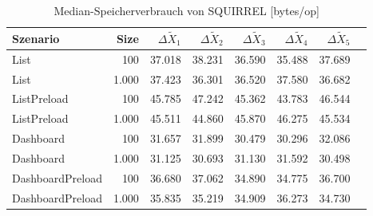 
\begin{table}[ht]
\setlength{\extrarowheight}{-1pt}
\centering
\caption{Median-Speicherverbrauch von SQUIRREL [bytes/op]}
\begin{tabular}{lrrrrrrr}
\toprule
Szenario & Size & ${\Delta \tilde{X}_1}$ & ${\Delta \tilde{X}_2}$ & ${\Delta \tilde{X}_3}$ & ${\Delta \tilde{X}_4}$ & ${\Delta \tilde{X}_5}$ \\
\midrule
	List & 100 & \cellcolor{red!50}  37.018 & \cellcolor{red!50}  38.231 & \cellcolor{red!50}  36.590 & \cellcolor{red!50}  35.488 & \cellcolor{red!50}  37.689 \\
	List & 1.000 & \cellcolor{red!50}  37.423 & \cellcolor{red!50}  36.301 & \cellcolor{red!50}  36.520 & \cellcolor{red!50}  37.580 & \cellcolor{red!50}  36.682 \\
	ListPreload & 100 & \cellcolor{red!50}  45.785 & \cellcolor{red!50}  47.242 & \cellcolor{red!50}  45.362 & \cellcolor{red!50}  43.783 & \cellcolor{red!50}  46.544 \\
	ListPreload & 1.000 & \cellcolor{red!50}  45.511 & \cellcolor{red!50}  44.860 & \cellcolor{red!50}  45.870 & \cellcolor{red!50}  46.275 & \cellcolor{red!50}  45.534 \\
	Dashboard & 100 & \cellcolor{red!50}  31.657 & \cellcolor{red!50}  31.899 & \cellcolor{red!50}  30.479 & \cellcolor{red!50}  30.296 & \cellcolor{red!50}  32.086 \\
	Dashboard & 1.000 & \cellcolor{red!50}  31.125 & \cellcolor{red!50}  30.693 & \cellcolor{red!50}  31.130 & \cellcolor{red!50}  31.592 & \cellcolor{red!50}  30.498 \\
	DashboardPreload & 100 & \cellcolor{red!50}  36.680 & \cellcolor{red!50}  37.062 & \cellcolor{red!50}  34.890 & \cellcolor{red!50}  34.775 & \cellcolor{red!50}  36.700 \\
	DashboardPreload & 1.000 & \cellcolor{red!50}  35.835 & \cellcolor{red!50}  35.219 & \cellcolor{red!50}  34.909 & \cellcolor{red!50}  36.273 & \cellcolor{red!50}  34.730 \\
\bottomrule
\end{tabular}
\label{tab:speicherverbrauch_squirrel}
\end{table}
	
